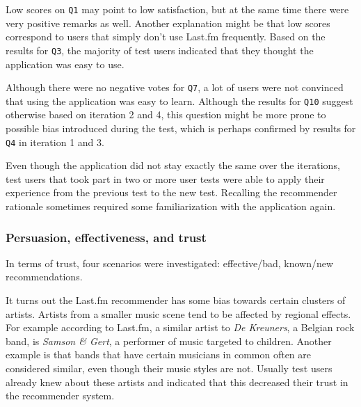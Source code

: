 \documentclass[a4paper,10pt,twocolumn]{article}
\begin{document}
Low scores on \texttt{Q1} may point to low satisfaction, but at the same time there were very positive remarks as well. Another explanation might be that low scores correspond to users that simply don't use Last.fm frequently. Based on the results for \texttt{Q3}, the majority of test users indicated that they thought the application was easy to use.

Although there were no negative votes for \texttt{Q7}, a lot of users were not convinced that using the application was easy to learn. Although the results for \texttt{Q10} suggest otherwise based on iteration 2 and 4, this question might be more prone to possible bias introduced during the test, which is perhaps confirmed by results for \texttt{Q4} in iteration 1 and 3.

Even though the application did not stay exactly the same over the iterations, test users that took part in two or more user tests were able to apply their experience from the previous test to the new test. Recalling the recommender rationale sometimes required some familiarization with the application again.



\subsubsection{Persuasion, effectiveness, and trust}


In terms of trust, four scenarios were investigated: effective/bad, known/new recommendations.

It turns out the Last.fm recommender has some bias towards certain clusters of artists. Artists from a smaller music scene tend to be affected by regional effects. For example according to Last.fm, a similar artist to \emph{De Kreuners}, a Belgian rock band, is \emph{Samson \& Gert}, a performer of music targeted to children. Another example is that bands that have certain musicians in common often are considered similar, even though their music styles are not. Usually test users already knew about these artists and indicated that this decreased their trust in the recommender system.
\end{document}
